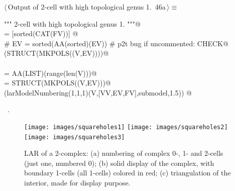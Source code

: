 \documentclass[11pt,oneside]{article}	%
\begin{document}
\begin{flushleft} \small \label{scrap76}
\protect{}$\langle\,$Output of 2-cell with high topological genus 1.\nobreak\ {\footnotesize 46a}$\,\rangle\equiv$
\vspace{-1ex}
\begin{list}{}{} \item
\mbox{}\verb@""" 2-cell with high topological genus 1. """@\\
\mbox{}\verb@FV = [sorted(CAT(FV))] @\\
\mbox{}\verb@# EV = sorted(AA(sorted)(EV))  # p2t bug if uncommented: CHECK@\\
\mbox{}\verb@VIEW(STRUCT(MKPOLS((V,EV))))@\\
\mbox{}\verb@@\\
\mbox{}\verb@VV = AA(LIST)(range(len(V)))@\\
\mbox{}\verb@submodel = STRUCT(MKPOLS((V,EV)))@\\
\mbox{}\verb@VIEW(larModelNumbering(1,1,1)(V,[VV,EV,FV],submodel,1.5)) @\\
\mbox{}\verb@@{\NWsep}
\end{list}
\vspace{-1ex}
\footnotesize\addtolength{\baselineskip}{-1ex}
\begin{list}{}{\setlength{\itemsep}{-\parsep}\setlength{\itemindent}{-\leftmargin}}
\item \NWtxtMacroRefIn\ .
\end{list}
\end{flushleft}


\begin{figure}[htbp] %
   \centering
   \texttt{[image: images/squareholes1]} 
   \texttt{[image: images/squareholes2]} 
   \texttt{[image: images/squareholes3]} 
   \caption{LAR of a 2-complex: (a) numbering of complex 0-, 1- and 2-cells (just one, numbered 0); (b) solid display of the complex, with boundary 1-cells (all 1-cells) colored in red; (c) triangulation of the interior, made for display purpose.}
   \label{fig:squareholes}
\end{figure}
\end{document}
